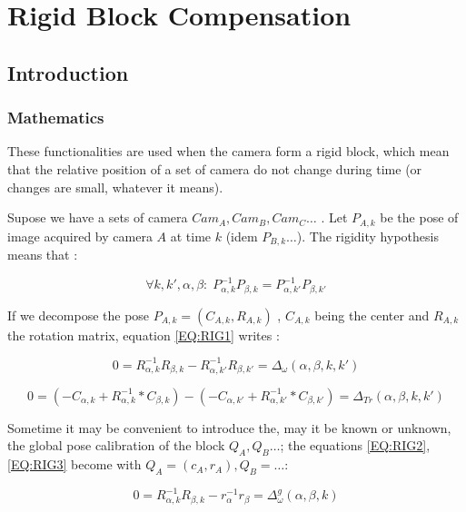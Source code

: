 \section{Rigid Block Compensation}

\subsection{Introduction}

\subsubsection{Mathematics}

These functionalities are used when the camera form a rigid block, which mean that the relative position
of a set of camera do not change during time (or changes are small, whatever it means).

Supose we have a sets of camera $Cam_A,Cam_B,Cam_C \dots $ . Let $P_{A,k}$ be the pose of image acquired by camera $A$
at time $k$ (idem $P_{B,k} \dots$).  The rigidity hypothesis means that :


\begin{equation}
     \forall k,k',\alpha,\beta  : \;
     P_{\alpha,k}^{-1} P_{\beta,k} =  P_{\alpha,k'}^{-1} P_{\beta,k'}
     \label{EQ:RIG1}
\end{equation}

If we decompose the pose  $P_{A,k} = (C_{A,k},R_{A,k})$ , $C_{A,k}$ being the center 
and $R_{A,k}$ the rotation matrix, equation \ref{EQ:RIG1}  writes :

\begin{equation}
     0 = R_{\alpha,k}^{-1} R_{\beta,k} -  R_{\alpha,k'}^{-1} R_{\beta,k'}
      = \Delta_{\omega}(\alpha,\beta,k,k')
     \label{EQ:RIG2}
\end{equation}

\begin{equation}
     0 = (- C_{\alpha,k}  + R_{\alpha,k}^{-1} * C_{\beta,k}) -(- C_{\alpha,k'}  + R_{\alpha,k'}^{-1} * C_{\beta,k'})
      = \Delta_{Tr}(\alpha,\beta,k,k')
     \label{EQ:RIG3}
\end{equation}

Sometime it may be convenient to introduce the, may it be known or unknown, 
the global pose calibration of the block $Q_A,Q_B \dots$; the
equations \ref{EQ:RIG2}, \ref{EQ:RIG3} become  with  $Q_A=(c_A,r_A), Q_B= \dots $:

\begin{equation}
     0 = R_{\alpha,k}^{-1} R_{\beta,k} -  r_{\alpha}^{-1} r_{\beta}
      = \Delta^g_{\omega}(\alpha,\beta,k)
     \label{EQ:RIG4}
\end{equation}


